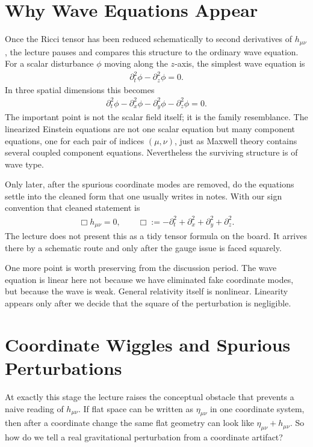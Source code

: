 \section{Why Wave Equations Appear}

Once the Ricci tensor has been reduced schematically to second derivatives of \(h_{\mu\nu}\), the lecture pauses and compares this structure to the ordinary wave equation. For a scalar disturbance \(\phi\) moving along the \(z\)-axis, the simplest wave equation is
\begin{align}
\partial_t^2\phi-\partial_z^2\phi=0.
\end{align}
In three spatial dimensions this becomes
\begin{align}
\partial_t^2\phi-\partial_x^2\phi-\partial_y^2\phi-\partial_z^2\phi=0.
\end{align}
The important point is not the scalar field itself; it is the family resemblance. The linearized Einstein equations are not one scalar equation but many component equations, one for each pair of indices \((\mu,\nu)\), just as Maxwell theory contains several coupled component equations. Nevertheless the surviving structure is of wave type.

Only later, after the spurious coordinate modes are removed, do the equations settle into the cleaned form that one usually writes in notes. With our sign convention that cleaned statement is
\begin{align}
\Box h_{\mu\nu}=0,
\qquad
\Box:=-\partial_t^2+\partial_x^2+\partial_y^2+\partial_z^2.
\end{align}
The lecture does not present this as a tidy tensor formula on the board. It arrives there by a schematic route and only after the gauge issue is faced squarely.

One more point is worth preserving from the discussion period. The wave equation is linear here not because we have eliminated fake coordinate modes, but because the wave is weak. General relativity itself is nonlinear. Linearity appears only after we decide that the square of the perturbation is negligible.

\section{Coordinate Wiggles and Spurious Perturbations}

At exactly this stage the lecture raises the conceptual obstacle that prevents a naive reading of \(h_{\mu\nu}\). If flat space can be written as \(\eta_{\mu\nu}\) in one coordinate system, then after a coordinate change the same flat geometry can look like \(\eta_{\mu\nu}+h_{\mu\nu}\). So how do we tell a real gravitational perturbation from a coordinate artifact?

